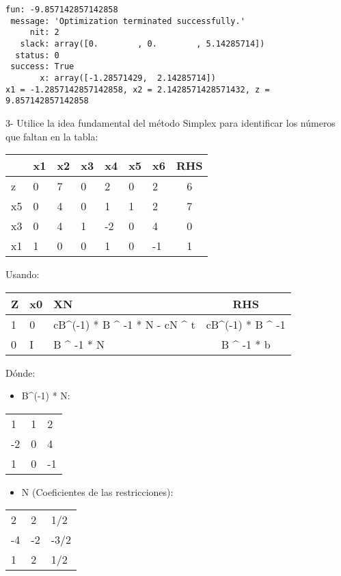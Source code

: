 \documentclass[11pt]{article}
\providecommand{\tightlist}{%
      \setlength{\itemsep}{0pt}\setlength{\parskip}{0pt}}
\begin{document}
    \begin{Verbatim}[commandchars=\\\{\}]
     fun: -9.857142857142858
 message: 'Optimization terminated successfully.'
     nit: 2
   slack: array([0.        , 0.        , 5.14285714])
  status: 0
 success: True
       x: array([-1.28571429,  2.14285714])
x1 = -1.2857142857142858, x2 = 2.1428571428571432, z = 9.857142857142858

    \end{Verbatim}

    3- Utilice la idea fundamental del método Simplex para identificar los
números que faltan en la tabla:

\begin{longtable}[]{@{}lllllllc@{}}
\toprule
& x1 & x2 & x3 & x4 & x5 & x6 & RHS\tabularnewline
\midrule
\endhead
z & 0 & 7 & 0 & 2 & 0 & 2 & 6\tabularnewline
x5 & 0 & 4 & 0 & 1 & 1 & 2 & 7\tabularnewline
x3 & 0 & 4 & 1 & -2 & 0 & 4 & 0\tabularnewline
x1 & 1 & 0 & 0 & 1 & 0 & -1 & 1\tabularnewline
\bottomrule
\end{longtable}

Usando:

\begin{longtable}[]{@{}lllc@{}}
\toprule
Z & x0 & XN & RHS\tabularnewline
\midrule
\endhead
1 & 0 & cB\^{}(-1) * B \^{} -1 * N - cN \^{} t & cB\^{}(-1) * B \^{}
-1\tabularnewline
0 & I & B \^{} -1 * N & B \^{} -1 * b\tabularnewline
\bottomrule
\end{longtable}

Dónde:

\begin{itemize}
\tightlist
\item
  B\^{}(-1) * N:
\end{itemize}

\begin{longtable}[]{@{}lll@{}}
\toprule
1 & 1 & 2\tabularnewline
-2 & 0 & 4\tabularnewline
1 & 0 & -1\tabularnewline
\bottomrule
\end{longtable}

\begin{itemize}
\tightlist
\item
  N (Coeficientes de las restricciones):
\end{itemize}

\begin{longtable}[]{@{}lll@{}}
\toprule
2 & 2 & 1/2\tabularnewline
-4 & -2 & -3/2\tabularnewline
1 & 2 & 1/2\tabularnewline
\bottomrule
\end{longtable}
\end{document}
